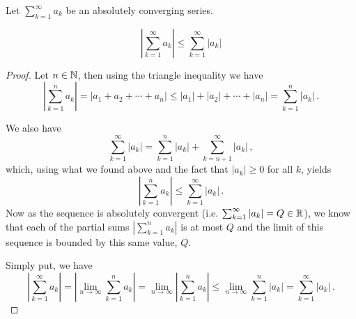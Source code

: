 \documentclass[week=5]{homework}
\begin{document}
\begin{questions}
    
	    \question
	    Let $\sum_{k=1}^{\infty} a_k$ be an absolutely converging series.
	    
	    \begin{toprove}
	    	\[
		    	\left| \sum_{k=1}^{\infty} a_k \right| \leq \sum_{k=1}^{\infty} |a_k|
	    	\]
	    \end{toprove}
    
	    \begin{proof}
	    	Let $n \in \mathbb{N}$, then using the triangle inequality we have
	    	\[
		    	\left| \sum_{k=1}^{n} a_k \right| = |a_1 + a_2 + \cdots + a_n | \leq |a_1| + |a_2| + \cdots + |a_n| = \sum_{k=1}^{n} |a_k|\,.
	    	\]
	    	
	    	We also have
	    	\[
		    	\sum_{k=1}^{\infty} |a_k| = \sum_{k=1}^{n} |a_k| + \sum_{k=n+1}^{\infty} |a_k|\,,
	    	\]
	    	which, using what we found above and the fact that $|a_k| \geq 0$ for all $k$, yields
	    	\[
		    	\left| \sum_{k=1}^{n} a_k \right| \leq \sum_{k=1}^{\infty} |a_k|\,.
	    	\]
	    	Now as the sequence is absolutely convergent (i.e. $\sum_{k=1}^{\infty} |a_k| = Q \in \mathbb{R}$), we know that each of the partial sums $\left|\sum_{k=1}^{n} a_k\right|$ is at most $Q$ and the limit of this sequence is bounded by this same value, $Q$.
	    	
	    	Simply put, we have
	    	\[
	    	\left| \sum_{k=1}^{\infty} a_k \right| = \left| \lim_{n\to\infty} \sum_{k=1}^{n} a_k \right| = \lim_{n\to\infty} \left|\sum_{k=1}^{n} a_k\right| \leq \lim_{n\to\infty} \sum_{k=1}^{n} |a_k| = \sum_{k=1}^{\infty} |a_k|\,.
	    	\]
	    \end{proof}
    

\end{questions}
\end{document}
